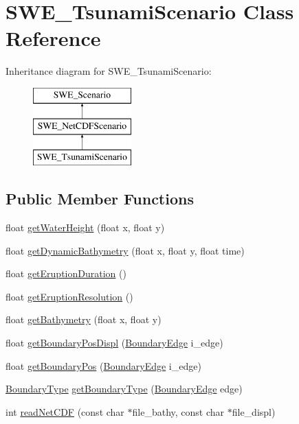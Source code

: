 \hypertarget{classSWE__TsunamiScenario}{\section{S\-W\-E\-\_\-\-Tsunami\-Scenario Class Reference}
\label{classSWE__TsunamiScenario}
}
Inheritance diagram for S\-W\-E\-\_\-\-Tsunami\-Scenario\-:\begin{figure}[H]
\begin{center}
\leavevmode
\includegraphics[height=3.000000cm]{classSWE__TsunamiScenario}
\end{center}
\end{figure}
\subsection*{Public Member Functions}
\begin{DoxyCompactItemize}
\item 
float \hyperlink{classSWE__TsunamiScenario_a134b99facf6169d2ef1edf0e5199b736}{get\-Water\-Height} (float x, float y)
\item 
float \hyperlink{classSWE__TsunamiScenario_abe7040ce4bc68d2d1fc49c656f576e6b}{get\-Dynamic\-Bathymetry} (float x, float y, float time)
\item 
float \hyperlink{classSWE__TsunamiScenario_aa53275f0c9fb683012027cf22e9f6cc5}{get\-Eruption\-Duration} ()
\item 
float \hyperlink{classSWE__TsunamiScenario_ab627e412b825638fce7c05441335e04c}{get\-Eruption\-Resolution} ()
\item 
float \hyperlink{classSWE__TsunamiScenario_aa2d2b0be8c3bc1d84ded47e075b5d433}{get\-Bathymetry} (float x, float y)
\item 
float \hyperlink{classSWE__TsunamiScenario_a2d7b506a09fa570511c29a910e3dddb1}{get\-Boundary\-Pos\-Displ} (\hyperlink{SWE__Scenario_8hh_aa5e01e3f7df312f7b9b0d02521141fcc}{Boundary\-Edge} i\-\_\-edge)
\item 
float \hyperlink{classSWE__TsunamiScenario_a701145868edb572d5958bbd739b80e0d}{get\-Boundary\-Pos} (\hyperlink{SWE__Scenario_8hh_aa5e01e3f7df312f7b9b0d02521141fcc}{Boundary\-Edge} i\-\_\-edge)
\item 
\hyperlink{SWE__Scenario_8hh_af75d5dd7322fa39ed0af4e7839e600f8}{Boundary\-Type} \hyperlink{classSWE__TsunamiScenario_add1e5ea1bf99e7602385e63f674ad9ad}{get\-Boundary\-Type} (\hyperlink{SWE__Scenario_8hh_aa5e01e3f7df312f7b9b0d02521141fcc}{Boundary\-Edge} edge)
\item 
int \hyperlink{classSWE__TsunamiScenario_a1dac5beed5b1a942e6fa8faa4ddc2312}{read\-Net\-C\-D\-F} (const char $\ast$file\-\_\-bathy, const char $\ast$file\-\_\-displ)
\end{DoxyCompactItemize}
